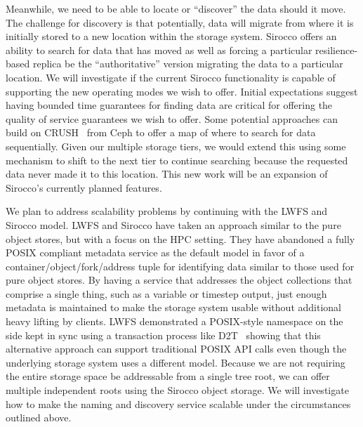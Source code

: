Meanwhile, we need to be able to locate or ``discover'' the data should it
move.  The challenge for discovery is that potentially, data will migrate from
where it is initially stored to a new location within the storage system.
Sirocco offers an ability to search for data that has moved as well as forcing
a particular resilience-based replica be the ``authoritative'' version
migrating the data to a particular location. We will investigate if the current
Sirocco functionality is capable of supporting the new operating modes we wish
to offer. Initial expectations suggest having bounded time guarantees for
finding data are critical for offering the quality of service guarantees we
wish to offer. Some potential approaches can build on CRUSH~\cite{weil:ceph}
from Ceph to offer a map of where to search for data sequentially. Given our
multiple storage tiers, we would extend this using some mechanism to shift to
the next tier to continue searching because the requested data never made it to
this location. This new work will be an expansion of Sirocco's currently
planned features.

We plan to address scalability problems by continuing with the LWFS and Sirocco
model. LWFS and Sirocco have taken an approach similar to the pure object
stores, but with a focus on the HPC setting. They have abandoned a fully POSIX
compliant metadata service as the default model in favor of a
container/object/fork/address tuple for identifying data similar to those used
for pure object stores. By having a service that addresses the object
collections that comprise a single thing, such as a variable or timestep
output, just enough metadata is maintained to make the storage system usable
without additional heavy lifting by clients.  LWFS demonstrated a POSIX-style
namespace on the side kept in sync using a transaction process like
D2T~\cite{lofstead:2012:txn} showing that this alternative approach can support
traditional POSIX API calls even though the underlying storage system uses a
different model. Because we are not requiring the entire storage space be
addressable from a single tree root, we can offer multiple independent roots
using the Sirocco object storage. We will investigate how to make the naming
and discovery service scalable under the circumstances outlined above.

